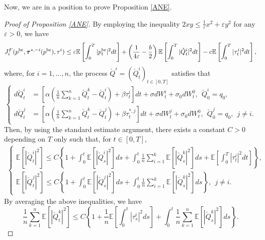 \documentclass[11pt]{article}
\numberwithin{equation}{section}
\begin{document}
Now, we are in a position to prove Proposition \ref{ANE}.
\begin{proof}[Proof of Proposition \ref{ANE}]
By employing the inequality $2xy\leq \frac{1}{\varepsilon} x^2+\varepsilon y^2$ for any $\varepsilon >0$, we have
\begin{align}\label{eq}
J_i^F(p^{{\rm br}},\boldsymbol{\tau}^{*,-i}(p^{{\rm br}}), \tau^i)%
\leq \varepsilon\mathbb{E}\left[\int_0^T|p_t^{{\rm br}}|^2dt\right]+\left(\frac{1}{4\varepsilon}-\frac{b  }{2}\right)\mathbb{E}\left[\int_0^T|\check{Q}_t^i|^2dt\right]-c  \mathbb{E}\left[\int_0^T|\tau_t^i|^2dt\right],
\end{align}
where, for $i=1,\ldots,n$, the process $\check{Q}^i=(\check{Q}_t^i)_{t\in[0,T]}$ satisfies that
\begin{equation}\label{eq:checkQ}
\left\{
\begin{aligned}
   d \check{Q}_t^i &=\left[\alpha \left(\frac{1}{n}\sum_{k=1}^n\check{Q}_t^k-\check{Q}_t^i\right)+\beta  \tau_t^i\right]dt+\sigma dW_t^i+\sigma_0dW_t^0,~~\check{Q}_0^i=q_0, \\[0.6em]
  d \check{Q}_t^j &=\left[\alpha\left(\frac{1}{n}\sum_{k=1}^n\check{Q}_t^k-\check{Q}_t^j\right)+\beta\tau_t^{*,j}\right]dt+\sigma d W_t^j+\sigma_0dW_t^0,~~\check{Q}_0^j=q_0,~~j\neq i.
\end{aligned}
\right.
\end{equation}
Then, by using the standard estimate argument, there exists a constant $C > 0$ depending on $T$ only such that, for $t\in[0,T]$,
\begin{align}\label{Qk}
\begin{cases}
	\displaystyle \mathbb{E}\left[|\check{Q}_t^i|^2\right]\leq C\left\{1+ \int_0^t\mathbb{E}\left[|\check{Q}_s^i|^2\right]ds+\int_0^t\frac{1}{n}\sum_{i=1}^k\mathbb{E}\left[|\check{Q}_s^k|^2\right]ds+\mathbb{E}\left[\int_0^T|\tau_t^i|^2dt\right]\right\},\\[0.6em]
	\displaystyle \mathbb{E}\left[|\check{Q}_t^j|^2\right]\leq C\left\{1+ \int_0^t\mathbb{E}\left[|\check{Q}_s^j|^2\right]ds+\int_0^t\frac{1}{n}\sum_{i=1}^k\mathbb{E}\left[|\check{Q}_s^k|^2\right]ds\right\},~~j\neq i.
\end{cases}
\end{align}
By averaging the above inequalities, we have
\begin{equation*}
	\frac{1}{n}\sum_{k=1}^n\mathbb{E}\left[|\check{Q}_t^k|^2\right]\leq C\left\{1+\frac{1}{n}\mathbb{E}\left[\int_0^t|\tau_s^i|^2ds\right]+\int_0^t\frac{1}{n}\sum_{k=1}^n\mathbb{E}\left[|\check{Q}_s^k|^2\right]ds\right\}.

\end{equation*}
\end{proof}
\end{document}
